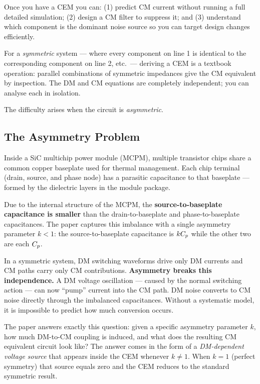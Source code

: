 \begin{physbox}
Once you have a CEM you can:
(1) predict CM current without running a full detailed simulation;
(2) design a CM filter to suppress it; and
(3) understand which component is the dominant noise source so you
can target design changes efficiently.
\end{physbox}

For a \emph{symmetric} system — where every component on line 1 is
identical to the corresponding component on line 2, etc.\ — deriving
a CEM is a textbook operation: parallel combinations of symmetric
impedances give the CM equivalent by inspection.  The DM and CM
equations are completely independent; you can analyse each in
isolation.

The difficulty arises when the circuit is \emph{asymmetric}.

\subsection{The Asymmetry Problem}

Inside a SiC multichip power module (MCPM), multiple transistor chips
share a common copper baseplate used for thermal management.  Each
chip terminal (drain, source, and phase node) has a parasitic
capacitance to that baseplate — formed by the dielectric layers in
the module package.

Due to the internal structure of the MCPM, the
\textbf{source-to-baseplate capacitance is smaller} than the
drain-to-baseplate and phase-to-baseplate capacitances.  The paper
captures this imbalance with a single asymmetry parameter $k < 1$:
the source-to-baseplate capacitance is $kC_{p}$ while the other two are
each $C_{p}$.

\begin{warningbox}
In a symmetric system, DM switching waveforms drive only DM currents
and CM paths carry only CM contributions.  \textbf{Asymmetry breaks
this independence.}  A DM voltage oscillation — caused by the normal
switching action — can now ``pump'' current into the CM path.  DM
noise converts to CM noise directly through the imbalanced
capacitances.  Without a systematic model, it is impossible to predict
how much conversion occurs.
\end{warningbox}

The paper answers exactly this question: given a specific asymmetry
parameter $k$, how much DM-to-CM coupling is induced, and what does
the resulting CM equivalent circuit look like?  The answer comes in
the form of a \emph{DM-dependent voltage source} that appears inside
the CEM whenever $k \neq 1$.  When $k = 1$ (perfect symmetry) that
source equals zero and the CEM reduces to the standard symmetric
result.

